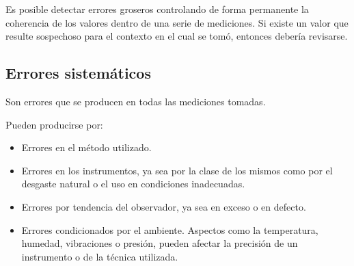 Es posible detectar errores groseros controlando de forma permanente la coherencia de los valores dentro de una serie de mediciones. Si existe un valor que resulte sospechoso para el contexto en el cual se tomó, entonces debería revisarse.

\subsection{Errores sistemáticos}

Son errores que se producen en todas las mediciones tomadas.

Pueden producirse por:
\begin{itemize}
	\item Errores en el método utilizado.
	\item Errores en los instrumentos, ya sea por la clase de los mismos como por el desgaste natural o el uso en condiciones inadecuadas.
	\item Errores por tendencia del observador, ya sea en exceso o en defecto.
	\item Errores condicionados por el ambiente. Aspectos como la temperatura, humedad, vibraciones o presión, pueden afectar la precisión de un instrumento o de la técnica utilizada.
\end{itemize}

